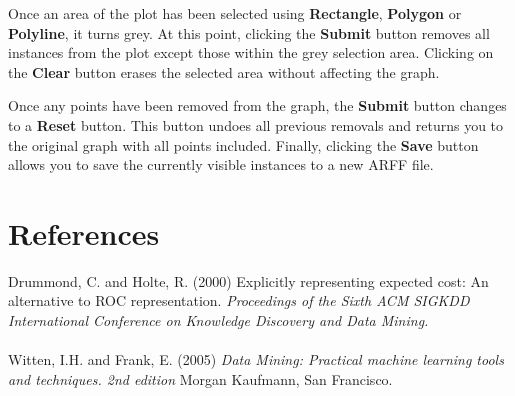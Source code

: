 \documentclass[a4paper]{article}
\begin{document}
Once an area of the plot has been selected using \textbf{Rectangle},
\textbf{Polygon} or \textbf{Polyline}, it turns grey.  At this point, clicking
the \textbf{Submit} button removes all instances from the plot except those
within the grey selection area.  Clicking on the \textbf{Clear} button erases
the selected area without affecting the graph.

Once any points have been removed from the graph, the \textbf{Submit} button
changes to a \textbf{Reset} button.  This button undoes all previous removals
and returns you to the original graph with all points included.  Finally,
clicking the \textbf{Save} button allows you to save the currently visible
instances to a new ARFF file.

\section*{References}

Drummond, C. and Holte, R. (2000) Explicitly representing expected cost: An alternative to ROC representation. \textit{Proceedings of the Sixth ACM SIGKDD International Conference on Knowledge Discovery and Data Mining.}
\\\\
Witten, I.H. and Frank, E. (2005) \textit{Data Mining: Practical machine
learning tools and techniques. 2nd edition}  Morgan Kaufmann, San
Francisco.
\end{document}
